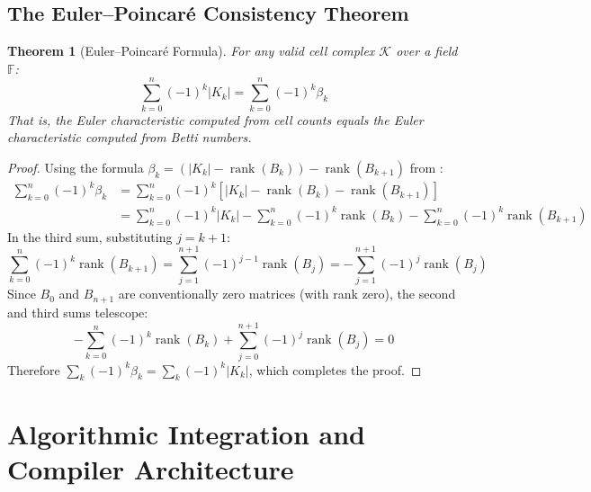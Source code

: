\documentclass[manuscript, nonacm, review=false]{acmart}
\theoremstyle{definition}
\theoremstyle{plain}
\newtheorem{theorem}{Theorem}[section]
\newcommand{\K}{\mathcal{K}}
\newcommand{\F}{\mathbb{F}}
\newcommand{\rank}{\operatorname{rank}}
\begin{document}
\subsection{The Euler--Poincar\'e Consistency Theorem}
\label{subsec:euler_poincare}

\begin{theorem}[Euler--Poincar\'e Formula]
\label{thm:euler_poincare}
For any valid cell complex $\K$ over a field $\F$:
\begin{equation}
    \sum_{k=0}^{n} (-1)^k |K_k| = \sum_{k=0}^{n} (-1)^k \beta_k
\end{equation}
That is, the Euler characteristic computed from cell counts equals the Euler characteristic computed from Betti numbers.
\end{theorem}

\begin{proof}
Using the formula $\beta_k = (|K_k| - \rank(B_k)) - \rank(B_{k+1})$ from :
\begin{align}
    \sum_{k=0}^{n} (-1)^k \beta_k &= \sum_{k=0}^{n} (-1)^k \left[ |K_k| - \rank(B_k) - \rank(B_{k+1}) \right] \\
    &= \sum_{k=0}^{n} (-1)^k |K_k| - \sum_{k=0}^{n} (-1)^k \rank(B_k) - \sum_{k=0}^{n} (-1)^k \rank(B_{k+1})
\end{align}
In the third sum, substituting $j = k+1$:
\begin{equation}
    \sum_{k=0}^{n} (-1)^k \rank(B_{k+1}) = \sum_{j=1}^{n+1} (-1)^{j-1} \rank(B_j) = -\sum_{j=1}^{n+1} (-1)^j \rank(B_j)
\end{equation}
Since $B_0$ and $B_{n+1}$ are conventionally zero matrices (with rank zero), the second and third sums telescope:
\begin{equation}
    -\sum_{k=0}^{n} (-1)^k \rank(B_k) + \sum_{j=0}^{n+1} (-1)^j \rank(B_j) = 0
\end{equation}
Therefore $\sum_{k} (-1)^k \beta_k = \sum_{k} (-1)^k |K_k|$, which completes the proof.
\end{proof}



\section{Algorithmic Integration and Compiler Architecture}
\label{sec:algorithms}
\end{document}
